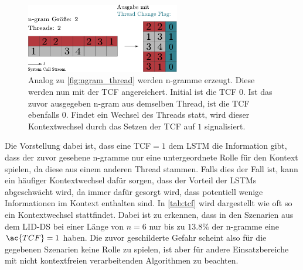                 \begin{figure}[ht]
                    \centering
                    \includegraphics[width=0.6\textwidth]{images/tcf.pdf}
                    \caption{Analog zu \autoref{fig:ngram_thread} werden n-gramme erzeugt.
                             Diese werden nun mit der \ac{TCF} angereichert.
                             Initial ist die \ac{TCF} $0$.
                             Ist das zuvor ausgegeben n-gram aus demselben Thread, ist die \ac{TCF} ebenfalls $0$.
                             Findet ein Wechsel des Threads statt, wird dieser Kontextwechsel durch das Setzen der \ac{TCF} auf $1$ signalisiert.}\label{fig:ngram_tcf}
                \end{figure}

                Die Vorstellung dabei ist, dass eine \ac{TCF}$= 1$ dem \ac{LSTM} die Information gibt, dass der zuvor gesehene n-gramme nur eine untergeordnete Rolle für den Kontext spielen, da diese aus einem anderen Thread stammen.
                Falls dies der Fall ist, kann ein häufiger Kontextwechsel dafür sorgen, dass der Vorteil der \ac{LSTM}s abgeschwächt wird, da immer dafür gesorgt wird, dass potentiell wenige Informationen im Kontext enthalten sind.
                In \autoref{tab:tcf} wird dargestellt wie oft so ein Kontextwechsel stattfindet.
                Dabei ist zu erkennen, dass in den Szenarien aus dem \ac{LID-DS} bei einer Länge von $n=6$ nur bis zu $13.8\%$ der n-gramme eine $\ac{TCF}=1$ haben.
                Die zuvor geschilderte Gefahr scheint also für die gegebenen Szenarien keine Rolle zu spielen, ist aber für andere Einsatzbereiche mit nicht kontextfreien verarbeitenden Algorithmen zu beachten.

